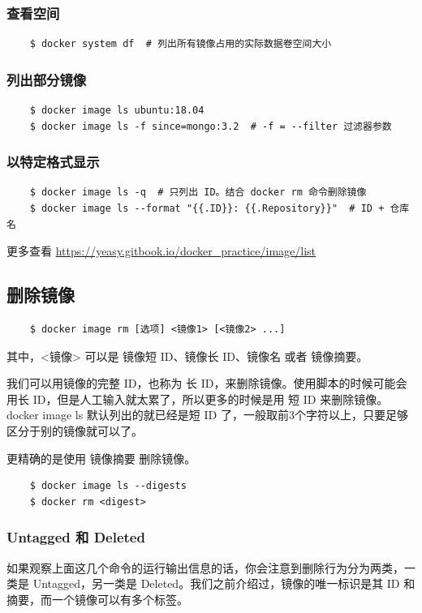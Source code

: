 \documentclass[UTF8]{ctexart}
\begin{document}
\subsubsection*{查看空间}
\begin{lstlisting}
    $ docker system df  # 列出所有镜像占用的实际数据卷空间大小
\end{lstlisting}

\subsubsection*{列出部分镜像}
\begin{lstlisting}
    $ docker image ls ubuntu:18.04
    $ docker image ls -f since=mongo:3.2  # -f = --filter 过滤器参数
\end{lstlisting}

\subsubsection*{以特定格式显示}
\begin{lstlisting}
    $ docker image ls -q  # 只列出 ID。结合 docker rm 命令删除镜像
    $ docker image ls --format "{{.ID}}: {{.Repository}}"  # ID + 仓库名
\end{lstlisting}
更多查看 \url{https://yeasy.gitbook.io/docker_practice/image/list}

\subsection{删除镜像}
\begin{lstlisting}
    $ docker image rm [选项] <镜像1> [<镜像2> ...]
\end{lstlisting}
其中，<镜像> 可以是 镜像短 ID、镜像长 ID、镜像名 或者 镜像摘要。

我们可以用镜像的完整 ID，也称为 长 ID，来删除镜像。使用脚本的时候可能会用长 ID，但是人工输入就太累了，所以更多的时候是用 短 ID 来删除镜像。docker image ls 默认列出的就已经是短 ID 了，一般取前3个字符以上，只要足够区分于别的镜像就可以了。

更精确的是使用 镜像摘要 删除镜像。
\begin{lstlisting}
    $ docker image ls --digests 
    $ docker rm <digest>
\end{lstlisting}

\subsubsection*{Untagged 和 Deleted}
如果观察上面这几个命令的运行输出信息的话，你会注意到删除行为分为两类，一类是 Untagged，另一类是 Deleted。我们之前介绍过，镜像的唯一标识是其 ID 和摘要，而一个镜像可以有多个标签。
\end{document}
